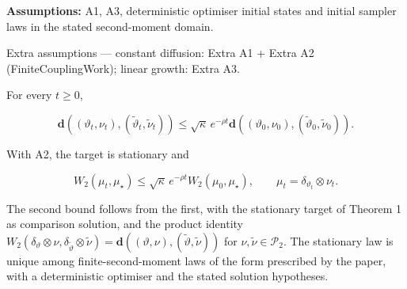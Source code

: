\documentclass[11pt,a4paper]{report}
\begin{document}
\textbf{Assumptions:} A1, A3, deterministic optimiser initial states and initial sampler laws in the stated second-moment domain.

Extra assumptions — constant diffusion: Extra A1 + Extra A2 (FiniteCouplingWork); linear growth: Extra A3.



For every \(t\ge0\),





\[\mathbf d((\vartheta_t,\nu_t),(\tilde\vartheta_t,\tilde\nu_t))\le\sqrt\kappa\,e^{-\rho t}\mathbf d((\vartheta_0,\nu_0),(\tilde\vartheta_0,\tilde\nu_0)).\]





With A2, the target is stationary and





\[W_2(\mu_t,\mu_\star)\le\sqrt\kappa\,e^{-\rho t}W_2(\mu_0,\mu_\star),\qquad\mu_t=\delta_{\vartheta_t}\otimes\nu_t.\]







The second bound follows from the first, with the stationary target of Theorem 1 as comparison solution, and the product identity \(W_2(\delta_\vartheta\otimes\nu,\delta_{\tilde\vartheta}\otimes\tilde\nu)=\mathbf d((\vartheta,\nu),(\tilde\vartheta,\tilde\nu))\) for \(\nu,\tilde\nu\in\mathcal P_2\). The stationary law is unique among finite-second-moment laws of the form prescribed by the paper, with a deterministic optimiser and the stated solution hypotheses.
\end{document}
